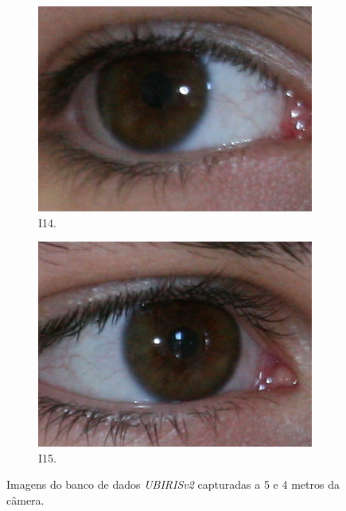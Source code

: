 \begin{figure}[htb]
\medskip
\begin{subfigure}{0.25\textwidth}
  \includegraphics[width=\linewidth]{img/Resultados/ubirisv2/C3_S1_I14.jpg}
  \caption{I14.}
\end{subfigure}\hfil %
\begin{subfigure}{0.25\textwidth}
  \includegraphics[width=\linewidth]{img/Resultados/ubirisv2/C3_S1_I15.jpg}
  \caption{I15.}
\end{subfigure}\hfil %
\caption{Imagens do banco de dados \textit{UBIRISv2} capturadas a 5 e 4 metros da câmera.}
\label{fig:experimentos:ubirisv2}
\end{figure}

\FloatBarrier

